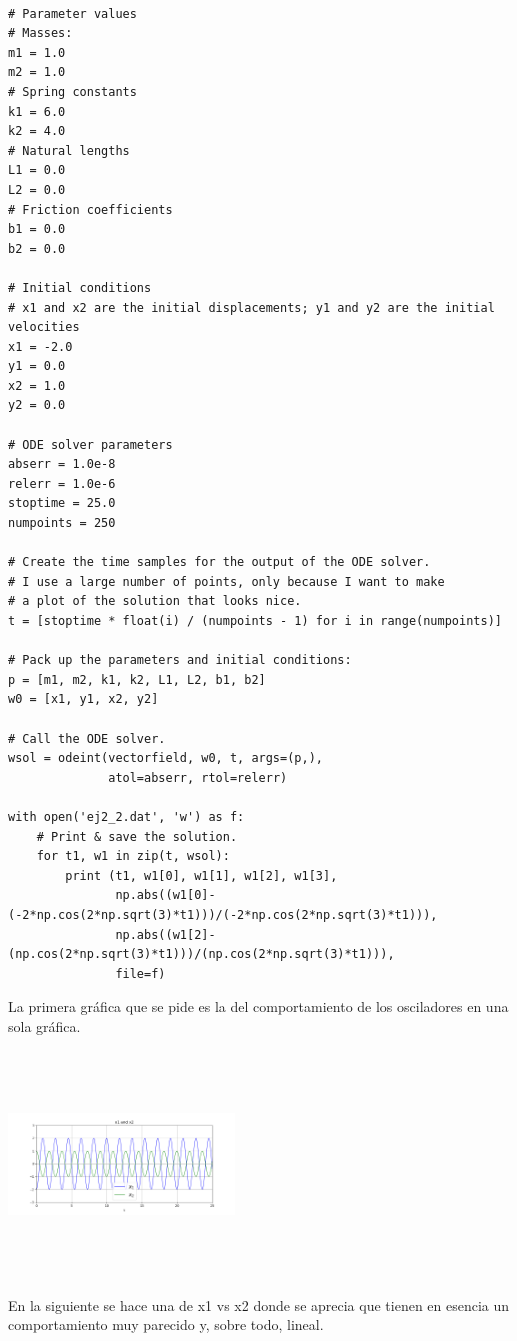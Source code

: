 \documentclass{article}
\begin{document}
\begin{verbatim}

# Parameter values
# Masses:
m1 = 1.0
m2 = 1.0
# Spring constants
k1 = 6.0
k2 = 4.0
# Natural lengths
L1 = 0.0
L2 = 0.0
# Friction coefficients
b1 = 0.0
b2 = 0.0

# Initial conditions
# x1 and x2 are the initial displacements; y1 and y2 are the initial velocities
x1 = -2.0
y1 = 0.0
x2 = 1.0
y2 = 0.0

# ODE solver parameters
abserr = 1.0e-8
relerr = 1.0e-6
stoptime = 25.0
numpoints = 250

# Create the time samples for the output of the ODE solver.
# I use a large number of points, only because I want to make
# a plot of the solution that looks nice.
t = [stoptime * float(i) / (numpoints - 1) for i in range(numpoints)]

# Pack up the parameters and initial conditions:
p = [m1, m2, k1, k2, L1, L2, b1, b2]
w0 = [x1, y1, x2, y2]

# Call the ODE solver.
wsol = odeint(vectorfield, w0, t, args=(p,),
              atol=abserr, rtol=relerr)

with open('ej2_2.dat', 'w') as f:
    # Print & save the solution.
    for t1, w1 in zip(t, wsol):
        print (t1, w1[0], w1[1], w1[2], w1[3],
               np.abs((w1[0]-(-2*np.cos(2*np.sqrt(3)*t1)))/(-2*np.cos(2*np.sqrt(3)*t1))), 
               np.abs((w1[2]-(np.cos(2*np.sqrt(3)*t1)))/(np.cos(2*np.sqrt(3)*t1))),
               file=f)
\end{verbatim}

La primera gráfica que se pide es la del comportamiento de los osciladores en una sola gráfica.


\begin{center}
  \includegraphics[width=6cm, height=6cm]{ej2_21.png}
\end{center}

En la siguiente se hace una de x1 vs x2 donde se aprecia que tienen en esencia un comportamiento muy parecido y, sobre todo, lineal. 
\end{document}
